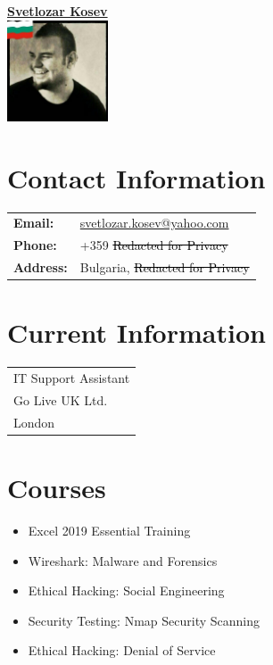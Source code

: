 \documentclass[letterpaper,10pt]{article}
\begin{document}
	
	\begin{minipage}[t]{0.4\textwidth}
		\begin{center}
			\Large\textbf{\href{https://www.linkedin.com/in/svetlozar-kosev-m-sc-it-278058144/}{Svetlozar Kosev}}\\[2ex]
			\includegraphics[width=3cm,height=3cm]{your_photo.jpg} %
		\end{center}
		
		\section*{Contact Information}
		\begin{tabular}{@{}l l}
			\textbf{Email:} & \href{mailto:svetlozar.kosev@}{svetlozar.kosev@yahoo.com} \\
			\textbf{Phone:} & +359 \textcolor{black}{\st{Redacted for Privacy}} \\
			\textbf{Address:} & Bulgaria, \textcolor{black}{\st{Redacted for Privacy}} \\
		\end{tabular}
		
		\section*{Current Information}
		\begin{tabular}{@{}l}
			IT Support Assistant \\
			Go Live UK Ltd. \\
			London \\
		\end{tabular}
		
		\section*{Courses}
		\begin{itemize}
			\item Excel 2019 Essential Training
			\item Wireshark: Malware and Forensics
			\item Ethical Hacking: Social Engineering
			\item Security Testing: Nmap Security Scanning
			\item Ethical Hacking: Denial of Service
		\end{itemize}
		

\end{minipage}
\end{document}
